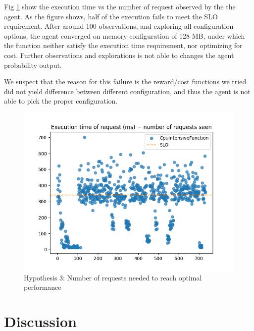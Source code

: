 \documentclass[conference]{IEEEtran}
\begin{document}
Fig \ref{fig: h4_results} show the execution time vs the number of request observed by the the agent. As the figure shows, half of the execution fails to meet the SLO requirement. After around 100 observations, and exploring all configuration options, the agent converged on memory configuration of 128 MB, under which the function neither satisfy the execution time requirement, nor optimizing for cost. Further observations and explorations is not able to changes the agent probability output.

We suspect that the reason for this failure is the reward/cost functions we tried did not yield difference between different configuration, and thus the agent is not able to pick the proper configuration.
\begin{figure}
    \includegraphics[width=1\linewidth]{images/H4_ExecutionTimeVsNumberOfRequests.png}
    \caption{Hypothesis 3: Number of requests needed to reach optimal performance}
    \label{fig: h4_results}
\end{figure}



\section{Discussion}
\end{document}
